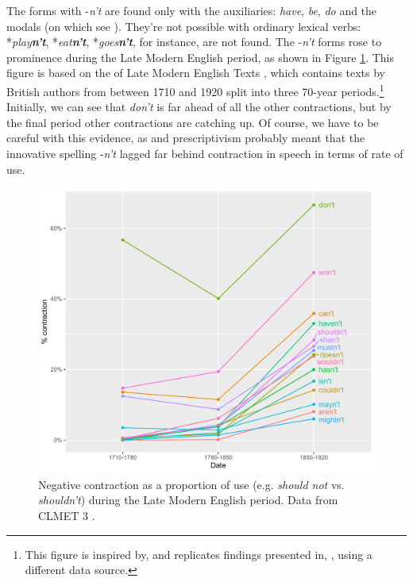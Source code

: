 The forms with -\textit{n't} are found only with the auxiliaries: \emph{have}, \emph{be}, \emph{do} and the modals (on which see ). They're not possible with ordinary lexical verbs: *\textit{play\textbf{n't}}, *\textit{eat\textbf{n't}}, *\textit{goes\textbf{n't}}, for instance, are not found. The -\textit{n't} forms rose to prominence during the Late Modern English period, as shown in Figure \ref{fig:NegCont}. This figure is based on the  of Late Modern English Texts \citep{CLMET3}, which contains texts by British authors from between 1710 and 1920 split into three 70-year periods.\footnote{This figure is inspired by, and replicates findings presented in, \citet{Nakamura2012}, using a different data source.} Initially, we can see that \textit{don't} is far ahead of all the other contractions, but by the final period other contractions are catching up. Of course, we have to be careful with this evidence, as  and prescriptivism probably meant that the innovative spelling -\textit{n't} lagged far behind contraction in speech in terms of rate of use.

\begin{figure}[t]
    \includegraphics[scale=0.7]{chapters/img/neg-contraction.pdf}
    \caption{Negative contraction as a proportion of use (e.g. \textit{should not} vs. \textit{shouldn't}) during the Late Modern English period. Data from CLMET 3 \citep{CLMET3}.}
    \label{fig:NegCont}
\end{figure}

